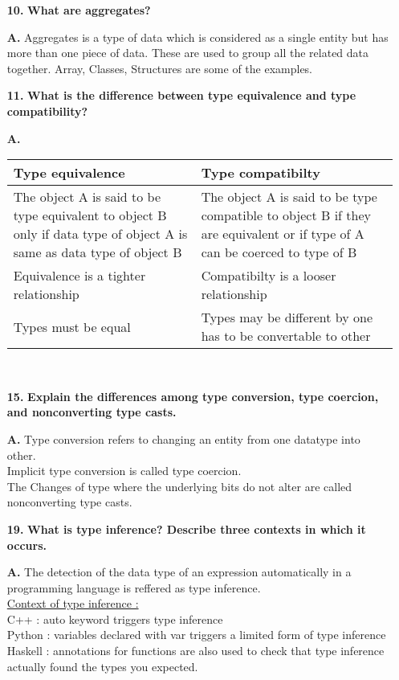 \documentclass[letterpaper]{article}
\begin{document}
\begin{large}
\begin{flushleft}
\begin{enumerate}
\item[\textbf{10.}]
\textbf{What are aggregates?}
\item[\textbf{A.}]
Aggregates is a type of data which is considered as a single entity but has more than one piece of data. These are used to group all the related data together. Array, Classes, Structures are some of the examples.\\[0.2in]
 
\item[\textbf{11.}]
\textbf{What is the difference between type equivalence and type compatibility?}
\item[\textbf{A.}]

\begin{tabular}{| m{8.55cm} | m{8.55cm} |}
\hline
\textbf{Type equivalence} & \textbf{Type compatibilty}\\
\hline
The object A is said to be type equivalent to object B only if data type of object A is same as data type of object B & The object A is said to be type compatible to object B if they are equivalent or if type of A can be coerced to type of B\\
\hline
Equivalence is a tighter relationship & Compatibilty is a looser relationship\\
\hline
Types must be equal & Types may be different by one has to be convertable to other\\
\hline
\end{tabular}\\[0.2in]

\item[\textbf{15.}]
\textbf{Explain the differences among type conversion, type coercion, and nonconverting type casts.}
\item[\textbf{A.}]
Type conversion refers to changing an entity from one datatype into other.\\
Implicit type conversion is called type coercion.\\
The Changes of type where the underlying bits do not alter are called nonconverting type casts.\\[0.2in]
 
\pagebreak

\item[\textbf{19.}]
\textbf{What is type inference? Describe three contexts in which it occurs.}
\item[\textbf{A.}]
The detection of the data type of an expression automatically in a programming language is reffered as type inference.\\
\underline{Context of type inference :}\\
C++ : auto keyword triggers type inference\\
Python : variables declared with var triggers a limited form of type inference\\
Haskell : annotations for functions are also used to check that type inference actually found the types you expected.\\[0.2in] 


\end{enumerate}
\end{flushleft}
\end{large}
\end{document}
